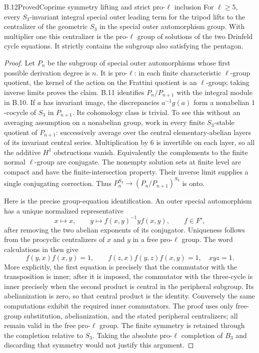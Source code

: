 \begin{statement}{B.12}{Proved}{Coprime symmetry lifting and strict pro-$\ell$ inclusion}
For $\ell\ge5$, every $S_3$-invariant integral special outer
leading term for the tripod lifts to the centralizer of the
geometric $S_3$ in the special outer automorphism group.
With multiplier one this centralizer is the pro-$\ell$
group of solutions of the two Drinfeld cycle equations.
It strictly contains the subgroup also satisfying the
pentagon.
\end{statement}
\begin{proof}
Let $P_n$ be the subgroup of special outer automorphisms
whose first possible derivation degree is $n$. It is
pro-$\ell$: in each finite characteristic $\ell$-group
quotient, the kernel of the action on the Frattini quotient
is an $\ell$-group; taking inverse limits proves the claim.
B.11 identifies $P_n/P_{n+1}$ with the integral module
in B.10. If $a$ has invariant image, the discrepancies
$a^{-1}g(a)$ form a nonabelian $1$-cocycle of $S_3$ in
$P_{n+1}$. Its cohomology class is trivial. To see this
without an averaging assumption on a nonabelian group,
work in every finite $S_3$-stable quotient of $P_{n+1}$:
successively average over the central elementary-abelian
layers of its invariant central series. Multiplication
by $6$ is invertible on each layer, so all the additive
$H^1$ obstructions vanish. Equivalently the complements
to the finite normal $\ell$-group are conjugate.
The nonempty solution sets at finite level are compact
and have the finite-intersection property. Their inverse
limit supplies a single conjugating correction. Thus
$P_n^{S_3}\to(P_n/P_{n+1})^{S_3}$ is onto.

Here is the precise group-equation identification. An
outer special automorphism has a unique normalized
representative
\[
 x\longmapsto x,\qquad y\longmapsto f(x,y)^{-1}y f(x,y),
 \qquad f\in F',
\]
after removing the two abelian exponents of its conjugator.
Uniqueness follows from the procyclic centralizers of
$x$ and $y$ in a free pro-$\ell$ group. The word
calculations in \citet[Propositions 3, 4 and Theorem 2]{HarbaterSchneps2000}
then give
\[
 f(y,x)f(x,y)=1,\qquad
 f(z,x)f(y,z)f(x,y)=1,\quad xyz=1.
\]
More explicitly, the first equation is precisely that
the commutator with the transposition is inner; after it
is imposed, the commutator with the three-cycle is inner
precisely when the second product is central in the
peripheral subgroup. Its abelianization is zero, so that
central product is the identity. Conversely the same
computations exhibit the required inner commutators.
The proof uses only free-group substitution, abelianization,
and the stated peripheral centralizers; all remain valid
in the free pro-$\ell$ group. The finite symmetry is
retained through the completion relative to $S_3$.
Taking the absolute pro-$\ell$ completion of $B_3$ and
discarding that symmetry would not justify this argument.


\end{proof}
